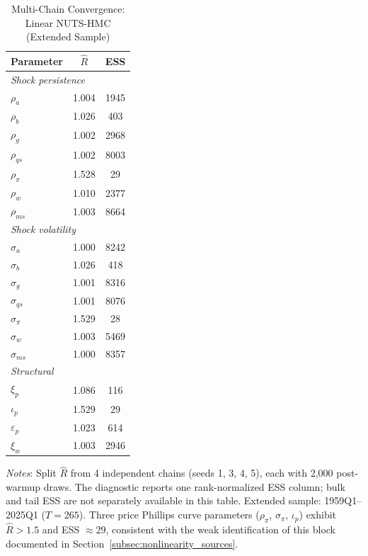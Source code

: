 \documentclass[12pt]{article}
\theoremstyle{plain}
\theoremstyle{definition}
\theoremstyle{remark}
\newcommand{\tablenotes}[1]{%
  \par\vspace{0.5em}%
  \noindent\begin{minipage}{\textwidth}%
  \raggedright\footnotesize #1%
  \end{minipage}\par%
}
\begin{document}
\begin{table}[htbp]
\centering
\caption{Multi-Chain Convergence: Linear NUTS-HMC (Extended Sample)}
\label{tab:rhat_linear}
\begin{tabular}{lcc}
\toprule
Parameter & $\hat{R}$ & ESS \\
\midrule
\multicolumn{3}{l}{\textit{Shock persistence}} \\
$\rho_a$ & 1.004 & 1945 \\
$\rho_b$ & 1.026 & 403 \\
$\rho_g$ & 1.002 & 2968 \\
$\rho_{qs}$ & 1.002 & 8003 \\
$\rho_\pi$ & 1.528 & 29 \\
$\rho_w$ & 1.010 & 2377 \\
$\rho_{ms}$ & 1.003 & 8664 \\
\midrule
\multicolumn{3}{l}{\textit{Shock volatility}} \\
$\sigma_a$ & 1.000 & 8242 \\
$\sigma_b$ & 1.026 & 418 \\
$\sigma_g$ & 1.001 & 8316 \\
$\sigma_{qs}$ & 1.001 & 8076 \\
$\sigma_\pi$ & 1.529 & 28 \\
$\sigma_w$ & 1.003 & 5469 \\
$\sigma_{ms}$ & 1.000 & 8357 \\
\midrule
\multicolumn{3}{l}{\textit{Structural}} \\
$\xi_p$ & 1.086 & 116 \\
$\iota_p$ & 1.529 & 29 \\
$\varepsilon_p$ & 1.023 & 614 \\
$\xi_w$ & 1.003 & 2946 \\
\bottomrule
\end{tabular}
\smallskip
\tablenotes{\textit{Notes}: Split $\hat{R}$ \citep{vehtari2021rank} from 4 independent chains (seeds 1, 3, 4, 5), each with 2{,}000 post-warmup draws. The diagnostic reports one rank-normalized ESS column; bulk and tail ESS are not separately available in this table. Extended sample: 1959Q1--2025Q1 ($T = 265$). Three price Phillips curve parameters ($\rho_\pi$, $\sigma_\pi$, $\iota_p$) exhibit $\hat{R} > 1.5$ and ESS $\approx 29$, consistent with the weak identification of this block documented in Section~\ref{subsec:nonlinearity_sources}.}
\end{table}
\end{document}
